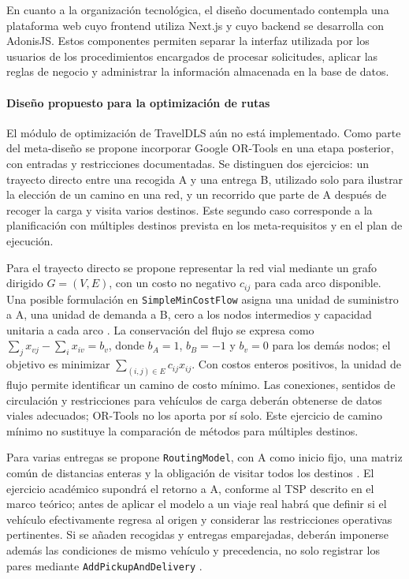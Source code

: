 En cuanto a la organización tecnológica, el diseño documentado contempla una plataforma web cuyo frontend utiliza Next.js y cuyo backend se desarrolla con AdonisJS. Estos componentes permiten separar la interfaz utilizada por los usuarios de los procedimientos encargados de procesar solicitudes, aplicar las reglas de negocio y administrar la información almacenada en la base de datos.

\paragraph{Diseño propuesto para la optimización de rutas}
El módulo de optimización de TravelDLS aún no está implementado. Como parte del meta-diseño se propone incorporar Google OR-Tools en una etapa posterior, con entradas y restricciones documentadas. Se distinguen dos ejercicios: un trayecto directo entre una recogida A y una entrega B, utilizado solo para ilustrar la elección de un camino en una red, y un recorrido que parte de A después de recoger la carga y visita varios destinos. Este segundo caso corresponde a la planificación con múltiples destinos prevista en los meta-requisitos y en el plan de ejecución.

Para el trayecto directo se propone representar la red vial mediante un grafo dirigido $G=(V,E)$, con un costo no negativo $c_{ij}$ para cada arco disponible. Una posible formulación en \texttt{SimpleMinCostFlow} asigna una unidad de suministro a A, una unidad de demanda a B, cero a los nodos intermedios y capacidad unitaria a cada arco \parencite{googleMinCostFlow}. La conservación del flujo se expresa como $\sum_j x_{vj}-\sum_i x_{iv}=b_v$, donde $b_A=1$, $b_B=-1$ y $b_v=0$ para los demás nodos; el objetivo es minimizar $\sum_{(i,j)\in E}c_{ij}x_{ij}$. Con costos enteros positivos, la unidad de flujo permite identificar un camino de costo mínimo. Las conexiones, sentidos de circulación y restricciones para vehículos de carga deberán obtenerse de datos viales adecuados; OR-Tools no los aporta por sí solo. Este ejercicio de camino mínimo no sustituye la comparación de métodos para múltiples destinos.

Para varias entregas se propone \texttt{RoutingModel}, con A como inicio fijo, una matriz común de distancias enteras y la obligación de visitar todos los destinos \parencite{googleTSP}. El ejercicio académico supondrá el retorno a A, conforme al TSP descrito en el marco teórico; antes de aplicar el modelo a un viaje real habrá que definir si el vehículo efectivamente regresa al origen y considerar las restricciones operativas pertinentes. Si se añaden recogidas y entregas emparejadas, deberán imponerse además las condiciones de mismo vehículo y precedencia, no solo registrar los pares mediante \texttt{AddPickupAndDelivery} \parencite{googlePickupDelivery}.

